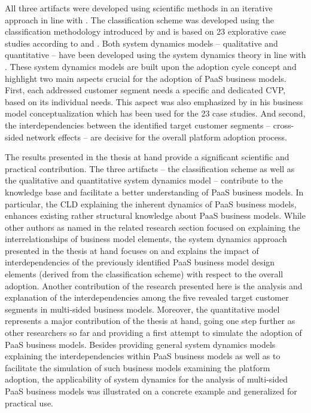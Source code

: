 All three artifacts were developed using scientific methods in an iterative approach in line with \citet{Hevner2007}. The classification scheme was developed using the classification methodology introduced by \citet{Fettke2003} and is based on 23 explorative case studies according to \citet{Eisenhardt1989} and \citet{Yin2008}. Both system dynamics models -- qualitative and quantitative -- have been developed using the system dynamics theory in line with \citet{Sterman2000,Sterman2001}. These system dynamics models are built upon the adoption cycle concept \citep{Sterman2001} and highlight two main aspects crucial for the adoption of \ac{PaaS} business models. First, each addressed customer segment needs a specific and dedicated \acf{CVP}, based on its individual needs. This aspect was also emphasized by \citet{Johnson2008} in his business model conceptualization which has been used for the 23 case studies. And second, the interdependencies between the identified target customer segments -- cross-sided network effects -- are decisive for the overall platform adoption process.

The results presented in the thesis at hand provide a significant scientific and practical contribution. The three artifacts -- the classification scheme as well as the qualitative and quantitative system dynamics model -- contribute to the knowledge base and facilitate a better understanding of \ac{PaaS} business models. In particular, the \ac{CLD} explaining the inherent dynamics of \ac{PaaS} business models, enhances existing rather structural knowledge about \ac{PaaS} business models. While other authors as named in the related research section focused on explaining the interrelationships of business model elements, the system dynamics approach presented in the thesis at hand focuses on and explains the impact of interdependencies of the previously identified \ac{PaaS} business model design elements (derived from the classification scheme) with respect to the overall adoption. Another contribution of the research presented here is the analysis and explanation of the interdependencies among the five revealed target customer segments in multi-sided business models. Moreover, the quantitative model represents a major contribution of the thesis at hand, going one step further as other researchers so far and providing a first attempt to simulate the adoption of \ac{PaaS} business models. Besides providing general system dynamics models explaining the interdependencies within \ac{PaaS} business models as well as to facilitate the simulation of such business models examining the platform adoption, the applicability of system dynamics for the analysis of multi-sided \ac{PaaS} business models was illustrated on a concrete example and generalized for practical use.

